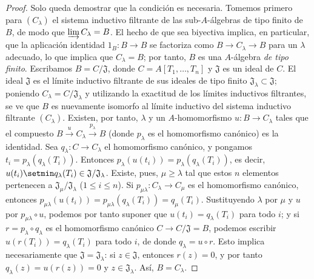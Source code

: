\begin{proof}
Solo queda demostrar que la condición es necesaria.
Tomemos primero para $(C_\lambda)$ el sistema inductivo filtrante de las sub-$A$-álgebras de tipo finito de $B$, de modo que $\varinjlim C_\lambda=B$.
El hecho de que  sea biyectiva implica, en particular, que la aplicación identidad $1_B:B\to B$ se factoriza como $B\to C_\lambda\to B$ para un $\lambda$ adecuado, lo que implica que $C_\lambda=B$; por tanto, $B$ es una $A$-álgebra \emph{de tipo finito}.
Escribamos $B=C/\mathfrak{J}$, donde $C=A[T_1,\ldots,T_n]$ y $\mathfrak{J}$ es un ideal de $C$. El ideal $\mathfrak{J}$ es el límite inductivo filtrante de sus ideales de tipo finito $\mathfrak{J}_\lambda\subset\mathfrak{J}$; poniendo $C_\lambda=C/\mathfrak{J}_\lambda$ y utilizando la exactitud de los límites inductivos filtrantes, se ve que $B$ es nuevamente isomorfo al límite inductivo del sistema inductivo filtrante $(C_\lambda)$.
Existen, por tanto, $\lambda$ y un $A$-homomorfismo $u:B\to C_\lambda$ tales que el compuesto $B\xrightarrow{u}C_\lambda\xrightarrow{p_\lambda}B$ (donde $p_\lambda$ es el homomorfismo canónico) es la identidad.
Sea $q_\lambda:C\to C_\lambda$ el homomorfismo canónico, y pongamos
$t_i=p_\lambda(q_\lambda(T_i))$.
Entonces $p_\lambda(u(t_i))=p_\lambda(q_\lambda(T_i))$, es decir,
$u(t_i)\setmin q_\lambda(T_i)\in\mathfrak{J}/\mathfrak{J}_\lambda$.
Existe, pues, $\mu\geqslant\lambda$ tal que estos $n$ elementos pertenecen a
$\mathfrak{J}_\mu/\mathfrak{J}_\lambda$ ($1\leqslant i\leqslant n$).
Si $p_{\mu\lambda}:C_\lambda\to C_\mu$ es el homomorfismo canónico, entonces
$p_{\mu\lambda}(u(t_i))=p_{\mu\lambda}(q_\lambda(T_i))=q_\mu(T_i)$.
Sustituyendo $\lambda$ por $\mu$ y $u$ por $p_{\mu\lambda}\circ u$, podemos por tanto
suponer que $u(t_i)=q_\lambda(T_i)$ para todo $i$; y si
$r=p_\lambda\circ q_\lambda$ es el homomorfismo canónico
$C\to C/\mathfrak{J}=B$, podemos escribir $u(r(T_i))=q_\lambda(T_i)$ para todo $i$,
de donde $q_\lambda=u\circ r$.
Esto implica necesariamente que $\mathfrak{J}=\mathfrak{J}_\lambda$: si $z\in\mathfrak{J}$, entonces $r(z)=0$, y por tanto $q_\lambda(z)=u(r(z))=0$ y $z\in\mathfrak{J}_\lambda$. Así, $B=C_\lambda$.


\end{proof}
